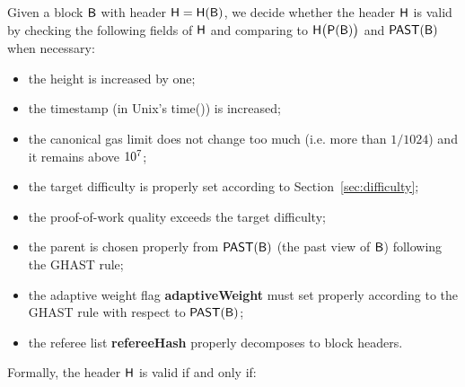 Given a block $\textsf{B}$ with header $\textsf{H}=\textsf{H}(\textsf{B})$, 
we decide whether the header $\textsf{H}$ is valid by 
checking the following fields of $\textsf{H}$
and comparing to $\textsf{H}\big(\mathsf{P}(\textsf{B})\big)$ and $\mathsf{PAST}(\textsf{B})$ when necessary:

\begin{itemize}[nosep]
	\item the height is increased by one;
	\item the timestamp (in Unix's time()) is increased;

	\item the canonical gas limit does not change too much (i.e. more than $1/1024$) and it remains above $10^7$;

	\item the target difficulty is properly set according to Section~\ref{sec:difficulty};

	\item the proof-of-work quality exceeds the target difficulty; 


	\item the parent is chosen properly from $\mathsf{PAST}(\textsf{B})$ (the past view of $\textsf{B}$) following the GHAST rule;

	\item the adaptive weight flag {\bf adaptiveWeight} must set properly according to the GHAST rule with respect to $\mathsf{PAST}(\textsf{B})$;




	\item the referee list {\bf refereeHash} properly decomposes to block headers.

\end{itemize}

\medskip

Formally, the header $\textsf{H}$ is valid if and only if: 


